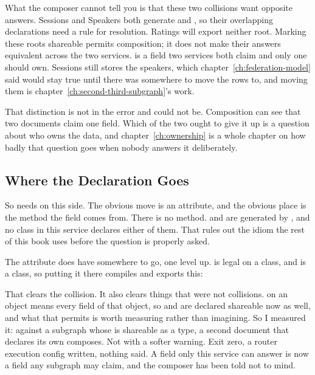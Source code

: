 %
What the composer cannot tell you is that these two collisions want opposite
answers. Sessions and Speakers both generate  and ,
so their overlapping declarations need a rule for resolution. Ratings will
export neither root. Marking these roots shareable permits composition; it
does not make their answers equivalent across the two services.
 is a field two services both claim and only one should own.
Sessions still stores the speakers, which chapter~\ref{ch:federation-model}
said would stay true until there was somewhere to move the rows to, and moving
them is chapter~\ref{ch:second-third-subgraph}'s work.

%
That distinction is not in the error and could not be. Composition can see that
two documents claim one field. Which of the two ought to give it up is a
question about who owns the data, and chapter~\ref{ch:ownership} is a whole
chapter on how badly that question goes when nobody answers it deliberately.

\subsection{Where the Declaration Goes}

%
So  needs  on this side. The obvious move is
an attribute, and the obvious place is the method the field comes from. There
is no method.  and  are generated by
, and no class in this service declares
either of them. That rules out the idiom the rest of this book uses before the
question is properly asked.

%
The attribute does have somewhere to go, one level up. \code{[Shareable]} is
legal on a class, and  is a class, so putting it there compiles and
exports this:

\begin{graphqlsdl}
type Query @shareable {
\end{graphqlsdl}

%
That clears the collision. It also clears things that were not collisions.
 on an object means every field of that object, so
 and  are declared shareable now as well, and
what that permits is worth measuring rather than imagining. So I measured it:
against a subgraph whose  is shareable as a type, a second document
that declares its own  composes. Not with a softer warning.
Exit zero, a router execution config written, nothing said. A field only this
service can answer is now a field any subgraph may claim, and the composer has
been told not to mind.

